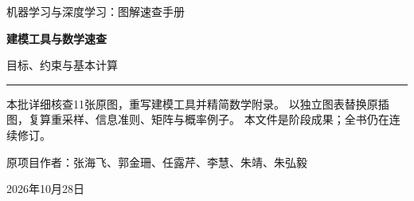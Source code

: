 \documentclass[a4paper,11pt,oneside,openany]{book}
\begin{document}
\frontmatter
\hypersetup{pageanchor=false}
\begin{titlepage}
\vspace*{16mm}
{\sffamily\color{Teal}\large 机器学习与深度学习：图解速查手册\par}
\vspace{15mm}
{\sffamily\bfseries\color{Ink}\Huge 建模工具与数学速查\par}
\vspace{6mm}
{\sffamily\color{Ink}\LARGE 目标、约束与基本计算\par}
\vspace{12mm}
\noindent\textcolor{Teal}{\rule{\textwidth}{1.2pt}}
\vspace{7mm}
\begin{keyidea}[第六批阶段样章]
本批详细核查11张原图，重写建模工具并精简数学附录。
以独立图表替换原插图，复算重采样、信息准则、矩阵与概率例子。
本文件是阶段成果；全书仍在连续修订。
\end{keyidea}
\vfill
原项目作者：张海飞、郭金珊、任露芹、李慧、朱靖、朱弘毅\par
\vspace{4mm}
2026年10月28日\par
\end{titlepage}
\hypersetup{pageanchor=true}
\tableofcontents
\mainmatter
\setcounter{chapter}{5}

\appendix

\end{document}
